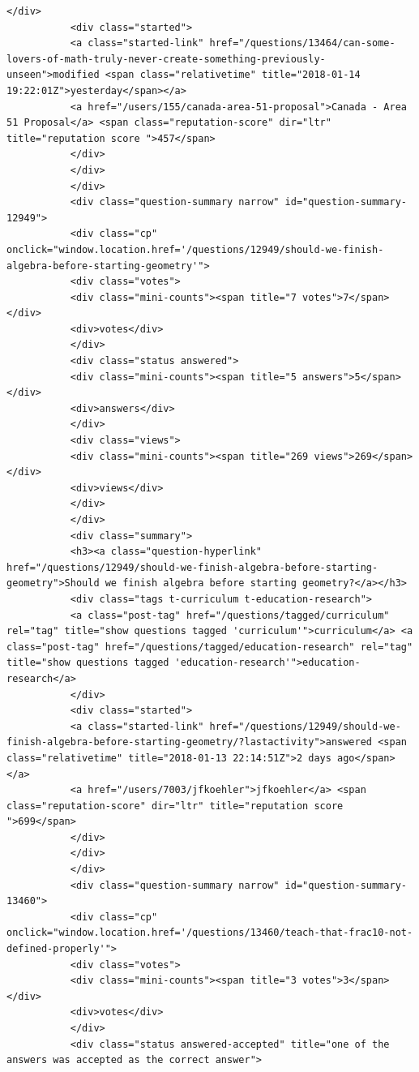\documentclass[11pt]{article}
\begin{document}
\begin{Verbatim}[commandchars=\\\{\}]
           </div>
           <div class="started">
           <a class="started-link" href="/questions/13464/can-some-lovers-of-math-truly-never-create-something-previously-unseen">modified <span class="relativetime" title="2018-01-14 19:22:01Z">yesterday</span></a>
           <a href="/users/155/canada-area-51-proposal">Canada - Area 51 Proposal</a> <span class="reputation-score" dir="ltr" title="reputation score ">457</span>
           </div>
           </div>
           </div>
           <div class="question-summary narrow" id="question-summary-12949">
           <div class="cp" onclick="window.location.href='/questions/12949/should-we-finish-algebra-before-starting-geometry'">
           <div class="votes">
           <div class="mini-counts"><span title="7 votes">7</span></div>
           <div>votes</div>
           </div>
           <div class="status answered">
           <div class="mini-counts"><span title="5 answers">5</span></div>
           <div>answers</div>
           </div>
           <div class="views">
           <div class="mini-counts"><span title="269 views">269</span></div>
           <div>views</div>
           </div>
           </div>
           <div class="summary">
           <h3><a class="question-hyperlink" href="/questions/12949/should-we-finish-algebra-before-starting-geometry">Should we finish algebra before starting geometry?</a></h3>
           <div class="tags t-curriculum t-education-research">
           <a class="post-tag" href="/questions/tagged/curriculum" rel="tag" title="show questions tagged 'curriculum'">curriculum</a> <a class="post-tag" href="/questions/tagged/education-research" rel="tag" title="show questions tagged 'education-research'">education-research</a>
           </div>
           <div class="started">
           <a class="started-link" href="/questions/12949/should-we-finish-algebra-before-starting-geometry/?lastactivity">answered <span class="relativetime" title="2018-01-13 22:14:51Z">2 days ago</span></a>
           <a href="/users/7003/jfkoehler">jfkoehler</a> <span class="reputation-score" dir="ltr" title="reputation score ">699</span>
           </div>
           </div>
           </div>
           <div class="question-summary narrow" id="question-summary-13460">
           <div class="cp" onclick="window.location.href='/questions/13460/teach-that-frac10-not-defined-properly'">
           <div class="votes">
           <div class="mini-counts"><span title="3 votes">3</span></div>
           <div>votes</div>
           </div>
           <div class="status answered-accepted" title="one of the answers was accepted as the correct answer">

\end{Verbatim}
\end{document}
